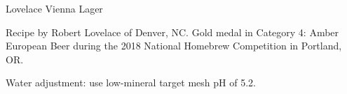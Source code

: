 \begin{recipe}{Lovelace Vienna Lager} %

\begin{aboutblock}
Recipe by Robert Lovelace of Denver, NC. Gold medal in Category 4: Amber European
Beer during the 2018 National Homebrew Competition in Portland, OR. \sourceaha
\end{aboutblock}


\begin{methodandtiming}
 
\begin{mashsteps}
\end{mashsteps}

\begin{fermentationsteps}
\end{fermentationsteps}

\begin{directions}
Water adjustment: use low-mineral target mesh pH of 5.2.
\end{directions}

\end{methodandtiming}

\recipebreak

\begin{ingredientsblock}

\begin{malts}
\end{malts}

\begin{hops}
\end{hops}


\end{ingredientsblock}

\end{recipe}

